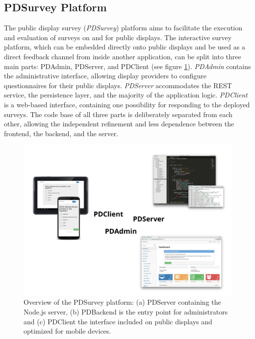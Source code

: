 

\subsection{PDSurvey Platform}

	The public display survey (\textit{PDSurvey}) platform aims to facilitate the execution and evaluation of surveys on and for public displays. 
	The interactive survey platform, which can be embedded directly onto public displays and be used as a direct feedback channel from inside another application, can be split into three main parts: PDAdmin, PDServer, and PDClient (see figure \ref{fig:4-pdsurvey-platform}). \textit{PDAdmin} contains the administrative interface, allowing display providers to configure questionnaires for their public displays. \textit{PDServer} accommodates the REST service, the persistence layer, and the majority of the application logic. \textit{PDClient} is a web-based interface, containing one possibility for responding to the deployed surveys. 
	The code base of all three parts is deliberately separated from each other, allowing the independent refinement and less dependence between the frontend, the backend, and the server.

	\begin{figure}[btph]
	    \begin{center}
	        \includegraphics[width=.7\columnwidth]{img/screenshots/pdsurvey-overview/pdsurvey-platform.png}
	    \end{center}
	 \caption[Overview of the PDSurvey platform]{Overview of the PDSurvey platform: (a) PDServer containing the Node.js server, (b) PDBackend is the entry point for administrators and (c) PDClient the interface included on public displays and optimized for mobile devices.}
	 \label{fig:4-pdsurvey-platform}
	\end{figure}



